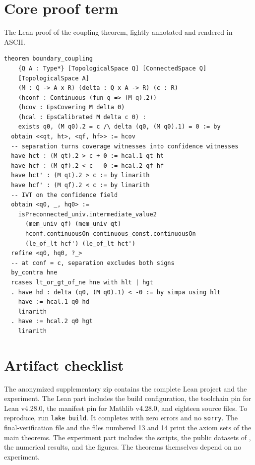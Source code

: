 \documentclass[mlmain,onecolumn]{jmlr}
\begin{document}
\section{Core proof term}
\label{app:leanproof}

The Lean proof of the coupling theorem, lightly annotated and
rendered in
ASCII.

\begin{verbatim}
theorem boundary_coupling
    {Q A : Type*} [TopologicalSpace Q] [ConnectedSpace Q]
    [TopologicalSpace A]
    (M : Q -> A x R) (delta : Q x A -> R) (c : R)
    (hconf : Continuous (fun q => (M q).2))
    (hcov : EpsCovering M delta 0)
    (hcal : EpsCalibrated M delta c 0) :
    exists q0, (M q0).2 = c /\ delta (q0, (M q0).1) = 0 := by
  obtain <<qt, ht>, <qf, hf>> := hcov
  -- separation turns coverage witnesses into confidence witnesses
  have hct : (M qt).2 > c + 0 := hcal.1 qt ht
  have hcf : (M qf).2 < c - 0 := hcal.2 qf hf
  have hct' : (M qt).2 > c := by linarith
  have hcf' : (M qf).2 < c := by linarith
  -- IVT on the confidence field
  obtain <q0, _, hq0> :=
    isPreconnected_univ.intermediate_value2
      (mem_univ qf) (mem_univ qt)
      hconf.continuousOn continuous_const.continuousOn
      (le_of_lt hcf') (le_of_lt hct')
  refine <q0, hq0, ?_>
  -- at conf = c, separation excludes both signs
  by_contra hne
  rcases lt_or_gt_of_ne hne with hlt | hgt
  . have hd : delta (q0, (M q0).1) < -0 := by simpa using hlt
    have := hcal.1 q0 hd
    linarith
  . have := hcal.2 q0 hgt
    linarith
\end{verbatim}

\section{Artifact checklist}
\label{app:artifact}

The anonymized supplementary zip contains the complete Lean project
and the experiment. The Lean part includes the build configuration,
the toolchain pin for Lean v4.28.0, the manifest pin for Mathlib
v4.28.0, and eighteen source files. To reproduce, run
\texttt{lake build}. It completes with zero errors and no
\texttt{sorry}. The final-verification file and the files numbered
13 and 14 print the axiom sets of the main theorems. The
experiment part includes the scripts, the public datasets of
\citet{marks2024geometry}, the numerical results, and the figures.
The theorems themselves depend on no experiment.
\end{document}
